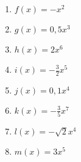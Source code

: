 \newpage
\begin{Exercise}[title={Skizziere das Schaubild, gib die Symmetrie sowie das Verhalten für sehr große/kleine \(x\) an.}, label=potenzA1]
	
	\begin{minipage}{\textwidth}
		\begin{minipage}{0.5\textwidth}
			\begin{enumerate}[label=\alph*)]
				\item \(f(x)=-x^2\)
				\item \(g(x)=0,5x^3\)
				\item \(h(x)=2x^6\)
				\item \(i(x)=-\frac{3}{2}x^5\)
			\end{enumerate}
		\end{minipage}%
		\begin{minipage}{0.5\textwidth}
			\begin{enumerate}[label=\alph*)]
				\setcounter{enumi}{4}
				\item \(j(x)=0,1x^4\)
				\item \(k(x)=-\frac{3}{5}x^7\)
				\item \(l(x)=-\sqrt{2}x^4\)
				\item \(m(x)=3x^5\)
			\end{enumerate}
		\end{minipage}%
	\end{minipage}%
\end{Exercise}
\newpage
